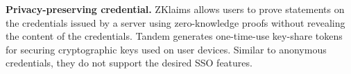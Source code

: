 \noindent\textbf{Privacy-preserving credential.}
ZKlaims \cite{zklaim} allows users to prove statements on the credentials issued by a server using zero-knowledge proofs without revealing the content of the credentials.
Tandem \cite{tandem} generates one-time-use key-share tokens for securing cryptographic keys used on user devices. %
Similar to anonymous credentials, they do not support the desired SSO features.



